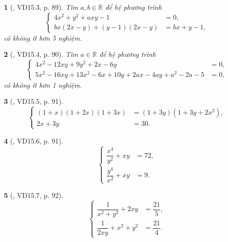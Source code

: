 \documentclass{article}
\newtheorem{baitoan}{}
\begin{document}
\begin{baitoan}[\cite{TLCT_THCS_Toan_9_dai_so}, VD15.3, p. 89]
	Tìm $a,b\in\mathbb{R}$ để hệ phương trình
	\begin{equation*}
		\left\{\begin{split}
			4x^2 + y^2 + axy - 1 &= 0,\\
			bx(2x - y) + (y - 1)(2x - y) &= bx + y - 1,
		\end{split}\right.
	\end{equation*}
	có không ít hơn 5 nghiệm.
\end{baitoan}

\begin{baitoan}[\cite{TLCT_THCS_Toan_9_dai_so}, VD15.4, p. 90]
	Tìm $a\in\mathbb{R}$ để hệ phương trình
	\begin{equation*}
		\left\{\begin{split}
			4x^2 - 12xy + 9y^2 + 2x - 6y &= 0,\\
			5x^2 - 16xy + 13x^2 - 6x + 10y + 2ax - 4ay + a^2 - 2a - 5 &= 0,
		\end{split}\right.
	\end{equation*}
	có không ít hơn 1 nghiệm.
\end{baitoan}

\begin{baitoan}[\cite{TLCT_THCS_Toan_9_dai_so}, VD15.5, p. 91]
	\begin{equation*}
		\left\{\begin{split}
			(1 + x)(1 + 2x)(1 + 3x) &= (1 + 3y)(1 + 3y + 2x^2),\\
			2x + 3y &= 30.
		\end{split}\right.
	\end{equation*}
\end{baitoan}

\begin{baitoan}[\cite{TLCT_THCS_Toan_9_dai_so}, VD15.6, p. 91]
	\begin{equation*}
		\left\{\begin{split}
			\dfrac{x^4}{y^2} + xy &= 72,\\
			\dfrac{y^4}{x^2} + xy &= 9.
		\end{split}\right.
	\end{equation*}
\end{baitoan}

\begin{baitoan}[\cite{TLCT_THCS_Toan_9_dai_so}, VD15.7, p. 92]
	\begin{equation*}
		\left\{\begin{split}
			\dfrac{1}{x^2 + y^2} + 2xy &= \dfrac{21}{5},\\
			\dfrac{1}{2xy} + x^2 + y^2 &= \dfrac{21}{4}.
		\end{split}\right.
	\end{equation*}
\end{baitoan}
\end{document}
